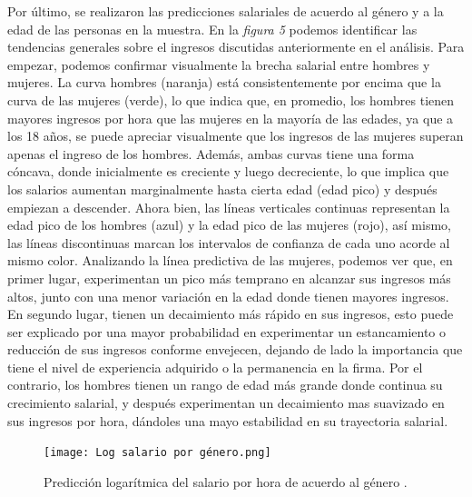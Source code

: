 \documentclass[10pt]{article}
\begin{document}
Por último, se realizaron las predicciones salariales de acuerdo al género y a la edad de las personas en la muestra. En la \textit{figura 5} podemos identificar las tendencias generales sobre el ingresos discutidas anteriormente en el análisis. Para empezar, podemos confirmar visualmente la brecha salarial entre hombres y mujeres. La curva hombres (naranja) está consistentemente por encima que la curva de las mujeres (verde), lo que indica que, en promedio, los hombres tienen mayores ingresos por hora que las mujeres en la mayoría de las edades, ya que a los 18 años, se puede apreciar visualmente que los ingresos de las mujeres superan apenas el ingreso de los hombres. Además, ambas curvas tiene una forma cóncava, donde inicialmente es creciente y luego decreciente, lo que implica que los salarios aumentan marginalmente hasta cierta edad (edad pico) y después empiezan a descender. Ahora bien, las líneas verticales continuas representan la edad pico de los hombres (azul) y la edad pico de las mujeres (rojo), así mismo, las líneas discontinuas marcan los intervalos de confianza de cada uno acorde al mismo color. Analizando la línea predictiva de las mujeres, podemos ver que, en primer lugar, experimentan un pico más temprano en alcanzar sus ingresos más altos, junto con una menor variación en la edad donde tienen mayores ingresos. En segundo lugar, tienen un decaimiento más rápido en sus ingresos, esto puede ser explicado por una mayor probabilidad en experimentar un estancamiento o reducción de sus ingresos conforme envejecen, dejando de lado la importancia que tiene el nivel de experiencia adquirido o la permanencia en la firma. Por el contrario, los hombres tienen un rango de edad más grande donde continua su crecimiento salarial, y después experimentan un decaimiento mas suavizado en sus ingresos por hora, dándoles una mayo estabilidad en su trayectoria salarial.

\begin{figure}[H]  
    \centering
    \texttt{[image: Log salario por género.png]} %
    \caption{Predicción logarítmica del salario por hora de acuerdo al género .}
    \label{fig: Gráfico 2}  %
\end{figure}
\end{document}
